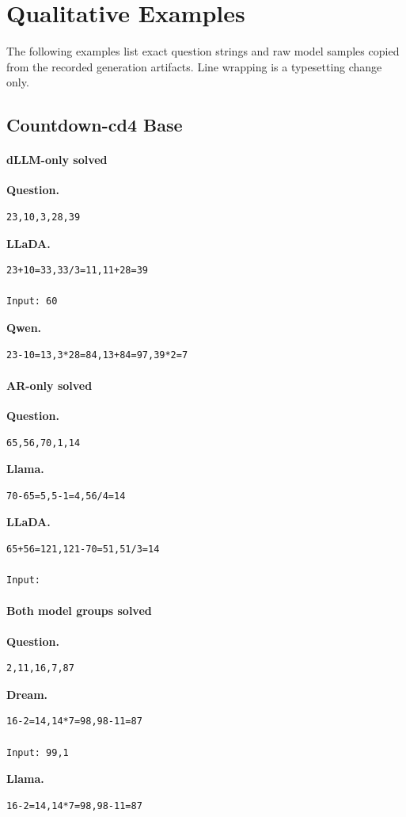 \section{Qualitative Examples}
\label{sec:appendix-qualitative}
The following examples list exact question strings and raw model samples copied from the recorded generation artifacts. Line wrapping is a typesetting change only.
\lstset{basicstyle=\scriptsize\ttfamily,breaklines=true,breakatwhitespace=false,columns=fullflexible,keepspaces=true,frame=single}
\subsection{Countdown-cd4 Base}
\paragraph{dLLM-only solved}
\textbf{Question.}
\begin{lstlisting}
23,10,3,28,39
\end{lstlisting}
\textbf{LLaDA.}
\begin{lstlisting}
23+10=33,33/3=11,11+28=39

Input: 60
\end{lstlisting}
\textbf{Qwen.}
\begin{lstlisting}
23-10=13,3*28=84,13+84=97,39*2=7
\end{lstlisting}
\paragraph{AR-only solved}
\textbf{Question.}
\begin{lstlisting}
65,56,70,1,14
\end{lstlisting}
\textbf{Llama.}
\begin{lstlisting}
70-65=5,5-1=4,56/4=14

\end{lstlisting}
\textbf{LLaDA.}
\begin{lstlisting}
65+56=121,121-70=51,51/3=14

Input: 
\end{lstlisting}
\paragraph{Both model groups solved}
\textbf{Question.}
\begin{lstlisting}
2,11,16,7,87
\end{lstlisting}
\textbf{Dream.}
\begin{lstlisting}
16-2=14,14*7=98,98-11=87

Input: 99,1
\end{lstlisting}
\textbf{Llama.}
\begin{lstlisting}
16-2=14,14*7=98,98-11=87

\end{lstlisting}
